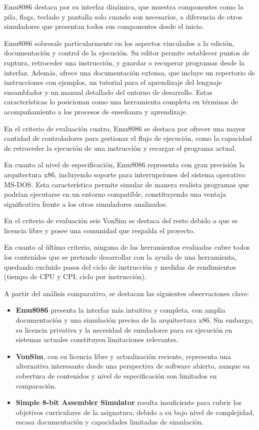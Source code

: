 \documentclass[12pt,oneside]{templates/unerthesis}
\providecommand{\tightlist}{%
  \setlength{\itemsep}{0pt}\setlength{\parskip}{0pt}}
\begin{document}
Emu8086 destaca por su interfaz dinámica, que muestra componentes como la pila, flags, teclado y pantalla solo cuando son necesarios, a diferencia de otros simuladores que presentan todos sus componentes desde el inicio.

Emu8086 sobresale particularmente en los aspectos vinculados a la edición, documentación y control de la ejecución. Su editor permite establecer puntos de ruptura, retroceder una instrucción, y guardar o recuperar programas desde la interfaz. Además, ofrece una documentación extensa, que incluye un repertorio de instrucciones con ejemplos, un tutorial para el aprendizaje del lenguaje ensamblador y un manual detallado del entorno de desarrollo. Estas características lo posicionan como una herramienta completa en términos de acompañamiento a los procesos de enseñanza y aprendizaje.

En el criterio de evaluación cuatro, Emu8086 se destaca por ofrecer una mayor cantidad de controladores para gestionar el flujo de ejecución, como la capacidad de retroceder la ejecución de una instrucción y recargar el programa actual.

En cuanto al nivel de especificación, Emu8086 representa con gran precisión la arquitectura x86, incluyendo soporte para interrupciones del sistema operativo MS-DOS. Esta característica permite simular de manera realista programas que podrían ejecutarse en un entorno compatible, constituyendo una ventaja significativa frente a los otros simuladores analizados.

En el criterio de evaluación seis VonSim se destaca del resto debido a que es licencia libre y posee una comunidad que respalda el proyecto.

En cuanto al último criterio, ninguna de las herramientas evaluadas cubre todos los contenidos que se pretende desarrollar con la ayuda de una herramienta, quedando excluido pasos del ciclo de instrucción y medidas de rendimientos (tiempo de CPU y CPI: ciclo por instrucción).

A partir del análisis comparativo, se destacan las siguientes observaciones clave:

\begin{itemize}
\tightlist
\item
  \textbf{Emu8086} presenta la interfaz más intuitiva y completa, con amplia documentación y una simulación precisa de la arquitectura x86. Sin embargo, su licencia privativa y la necesidad de emuladores para su ejecución en sistemas actuales constituyen limitaciones relevantes.
\item
  \textbf{VonSim}, con su licencia libre y actualización reciente, representa una alternativa interesante desde una perspectiva de software abierto, aunque su cobertura de contenidos y nivel de especificación son limitados en comparación.
\item
  \textbf{Simple 8-bit Assembler Simulator} resulta insuficiente para cubrir los objetivos curriculares de la asignatura, debido a su bajo nivel de complejidad, escasa documentación y capacidades limitadas de simulación.
\end{itemize}
\end{document}
